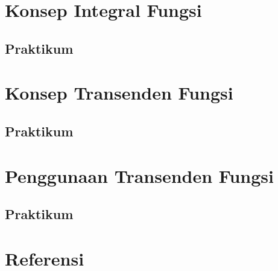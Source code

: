 \documentclass[
]{book}
\begin{document}
\chapter{Konsep Integral Fungsi}\label{Konsep_Integral_Fungsi}

\section{Praktikum}\label{praktikum-4}

\chapter{Konsep Transenden Fungsi}\label{Konsep_Transenden_Fungsi}

\section{Praktikum}\label{praktikum-5}

\chapter{Penggunaan Transenden Fungsi}\label{Penggunaan_Transenden_Fungsi}

\section{Praktikum}\label{praktikum-6}

\chapter{Referensi}\label{referensi}

  
\end{document}
